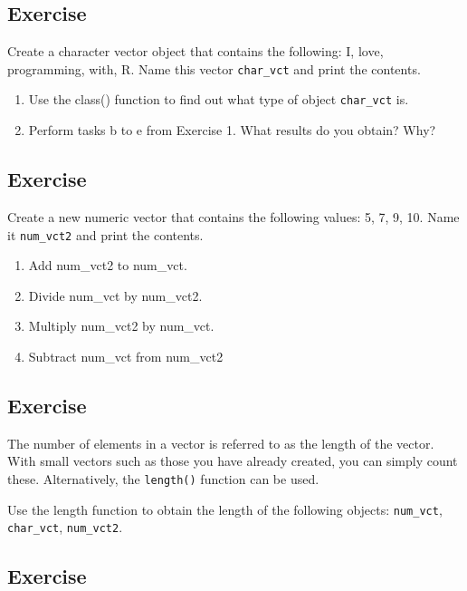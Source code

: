 \documentclass[
]{book}
\providecommand{\tightlist}{%
  \setlength{\itemsep}{0pt}\setlength{\parskip}{0pt}}
\begin{document}
\hypertarget{exercise-1}{%
\subsection{Exercise}\label{exercise-1}}

Create a character vector object that contains the following: I, love, programming, with, R. Name this vector \texttt{char\_vct} and print the contents.

\begin{enumerate}
\def\labelenumi{\alph{enumi}.}
\tightlist
\item
  Use the class() function to find out what type of object \texttt{char\_vct} is.
\item
  Perform tasks b to e from Exercise 1. What results do you obtain? Why?
\end{enumerate}

\hypertarget{exercise-2}{%
\subsection{Exercise}\label{exercise-2}}

Create a new numeric vector that contains the following values: 5, 7, 9, 10. Name it \texttt{num\_vct2} and print the contents.

\begin{enumerate}
\def\labelenumi{\alph{enumi}.}
\tightlist
\item
  Add num\_vct2 to num\_vct.
\item
  Divide num\_vct by num\_vct2.
\item
  Multiply num\_vct2 by num\_vct.
\item
  Subtract num\_vct from num\_vct2
\end{enumerate}

\hypertarget{exercise-3}{%
\subsection{Exercise}\label{exercise-3}}

The number of elements in a vector is referred to as the length of the vector. With small vectors such as those you have already created, you can simply count these. Alternatively, the \texttt{length()} function can be used.

Use the length function to obtain the length of the following objects: \texttt{num\_vct}, \texttt{char\_vct}, \texttt{num\_vct2}.

\hypertarget{exercise-4}{%
\subsection{Exercise}\label{exercise-4}}
\end{document}
